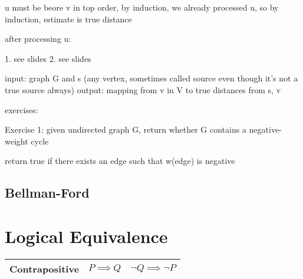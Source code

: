 \documentclass{article}
\begin{document}
u must be beore v in top order, by induction, we already processed u, so by induction, 
estimate is true distance

after processing u:

1. see slides
2. see slides






input: graph G and s (any vertex, sometimes called source even though it's not a true source always)
output: mapping from v in V to true distances from s, v




exercises:

Exercise 1: given undirected graph G, return whether G contains a negative-weight cycle


return true if there exists an edge such that w(edge) is negative

\subsection{Bellman-Ford}



\section{Logical Equivalence}


\begin{tabular}{|c|c|c|}
    \hline
    Contrapositive & $P \implies Q$ & $\neg Q \implies \neg P$ \\
    \hline

\end{tabular}
\end{document}
